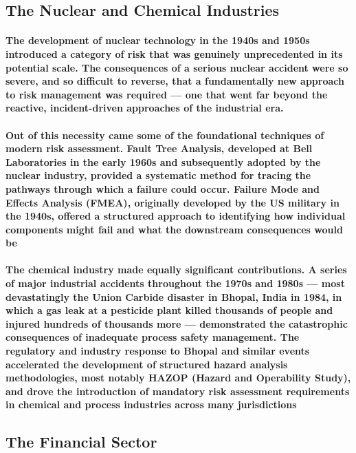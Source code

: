 \subsection{The Nuclear and Chemical Industries}

\paragraph{The development of nuclear technology in the 1940s and 1950s introduced a category of risk that was genuinely unprecedented in its potential scale. The consequences of a serious nuclear accident were so severe, and so difficult to reverse, that a fundamentally new approach to risk management was required — one that went far beyond the reactive, incident-driven approaches of the industrial era.}
\paragraph{Out of this necessity came some of the foundational techniques of modern risk assessment. \textbf{Fault Tree Analysis}, developed at Bell Laboratories in the early 1960s and subsequently adopted by the nuclear industry, provided a systematic method for tracing the pathways through which a failure could occur. \textbf{Failure Mode and Effects Analysis (FMEA)}, originally developed by the US military in the 1940s, offered a structured approach to identifying how individual components might fail and what the downstream consequences would be}
\paragraph{The chemical industry made equally significant contributions. A series of major industrial accidents throughout the 1970s and 1980s — most devastatingly the Union Carbide disaster in Bhopal, India in 1984, in which a gas leak at a pesticide plant killed thousands of people and injured hundreds of thousands more — demonstrated the catastrophic consequences of inadequate process safety management. The regulatory and industry response to Bhopal and similar events accelerated the development of structured hazard analysis methodologies, most notably \textbf{HAZOP (Hazard and Operability Study)}, and drove the introduction of mandatory risk assessment requirements in chemical and process industries across many jurisdictions}

\subsection{The Financial Sector}

